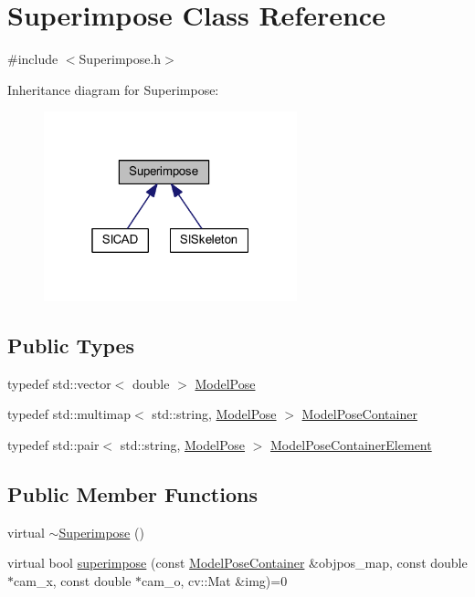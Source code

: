 \hypertarget{classSuperimpose}{}\section{Superimpose Class Reference}
\label{classSuperimpose}


{\ttfamily \#include $<$Superimpose.\+h$>$}



Inheritance diagram for Superimpose\+:
\nopagebreak
\begin{figure}[H]
\begin{center}
\leavevmode
\includegraphics[width=208pt]{classSuperimpose__inherit__graph}
\end{center}
\end{figure}
\subsection*{Public Types}
\begin{DoxyCompactItemize}
\item 
typedef std\+::vector$<$ double $>$ \mbox{\hyperlink{classSuperimpose_a85d40a5caf19f486d1e0c15c0a025378}{Model\+Pose}}
\item 
typedef std\+::multimap$<$ std\+::string, \mbox{\hyperlink{classSuperimpose_a85d40a5caf19f486d1e0c15c0a025378}{Model\+Pose}} $>$ \mbox{\hyperlink{classSuperimpose_a178e3d4e2def6635bfcf9454dd4b5d22}{Model\+Pose\+Container}}
\item 
typedef std\+::pair$<$ std\+::string, \mbox{\hyperlink{classSuperimpose_a85d40a5caf19f486d1e0c15c0a025378}{Model\+Pose}} $>$ \mbox{\hyperlink{classSuperimpose_a1e02e0225687b42296dcfee4eadf8a55}{Model\+Pose\+Container\+Element}}
\end{DoxyCompactItemize}
\subsection*{Public Member Functions}
\begin{DoxyCompactItemize}
\item 
virtual \mbox{\hyperlink{classSuperimpose_a9e32031994dc105b1572e7a6db26b41b}{$\sim$\+Superimpose}} ()
\item 
virtual bool \mbox{\hyperlink{classSuperimpose_a62c4c269b8fc34cc36d3d54fa4acb35c}{superimpose}} (const \mbox{\hyperlink{classSuperimpose_a178e3d4e2def6635bfcf9454dd4b5d22}{Model\+Pose\+Container}} \&objpos\+\_\+map, const double $\ast$cam\+\_\+x, const double $\ast$cam\+\_\+o, cv\+::\+Mat \&img)=0
\end{DoxyCompactItemize}


